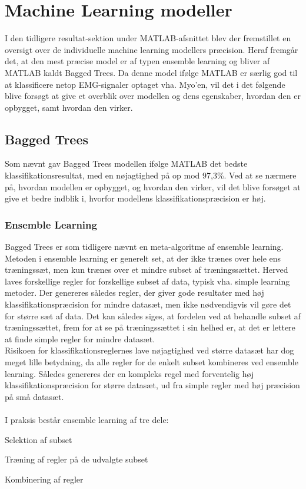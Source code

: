 \thispagestyle{fancy}

\chapter{Machine Learning modeller}
\label{chp:mlm}
I den tidligere resultat-sektion under MATLAB-afsnittet blev der fremstillet en oversigt over de individuelle machine learning modellers præcision. Heraf fremgår det, at den mest præcise model er af typen ensemble learning og bliver af MATLAB kaldt Bagged Trees. Da denne model ifølge MATLAB er særlig god til at klassificere netop EMG-signaler optaget vha. Myo'en, vil det i det følgende blive forsøgt at give et overblik over modellen og dens egenskaber, hvordan den er opbygget, samt hvordan den virker. 

\section{Bagged Trees}
\label{sec:baggedTrees}
Som nævnt gav Bagged Trees modellen ifølge MATLAB det bedste klassifikationsresultat, med en nøjagtighed på op mod 97,3\%. Ved at se nærmere på, hvordan modellen er opbygget, og hvordan den virker, vil det blive forsøget at give et bedre indblik i, hvorfor modellens klassifikationspræcision er høj. 

\subsection{Ensemble Learning}
Bagged Trees er som tidligere nævnt en meta-algoritme af ensemble learning. Metoden i ensemble learning er generelt set, at der ikke trænes over hele ens træningssæt, men kun trænes over et mindre subset af træningssættet. Herved laves forskellige regler for forskellige subset af data, typisk vha. simple learning metoder. Der genereres således regler, der giver gode resultater med høj klassifikationspræcision for mindre datasæt, men ikke nødvendigvis vil gøre det for større sæt af data. 
Det kan således siges, at fordelen ved at behandle subset af træningssættet, frem for at se på træningssættet i sin helhed er, at det er lettere at finde simple regler for mindre datasæt.
\\Risikoen for klassifikationsreglernes lave nøjagtighed ved større datasæt har dog meget lille betydning, da alle regler for de enkelt subset kombineres ved ensemble learning. Således genereres der en kompleks regel med forventelig høj klassifikationspræcision for større datasæt, ud fra simple regler med høj præcision på små datasæt.
\\\\
I praksis består ensemble learning af tre dele:
\begin{myEnumerate}
\item Selektion af subset
\item Træning af regler på de udvalgte subset
\item Kombinering af regler 
\end{myEnumerate}

